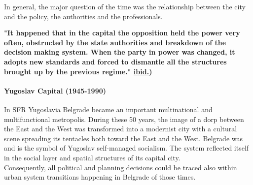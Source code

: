 \documentclass[11pt]{report}
\begin{document}
In general, the major question of the time was the relationship between the city and the policy, the authorities and the professionals.

\textbf{"It happened that in the capital the opposition held the power very often, obstructed by the state authorities and breakdown of the decision making system. When the party in power was changed, it adopts new standards and forced to dismantle all the structures brought up by the previous regime." \href{}{ibid.})}

\paragraph{Yugoslav Capital (1945-1990)}

In SFR Yugoslavia Belgrade became an important multinational and  multifunctional  metropolis. During these 50 years, the image of a dorp between the East and the West was transformed into a modernist city with a cultural scene spreading its tentacles both toward the East and the West. Belgrade was and is the symbol of Yugoslav self-managed socialism. The system reflected itself in the social layer and spatial structures of its capital city.
\\
Consequently, all political and planning decisions could be traced also within urban system transitions happening in Belgrade of those times.
\end{document}
